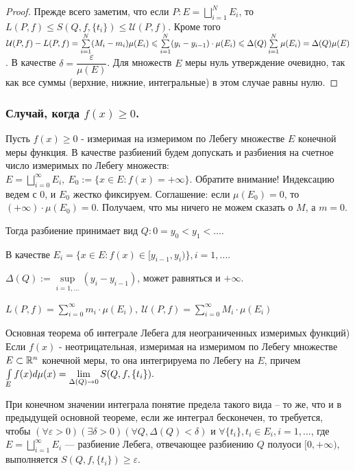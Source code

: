 \begin{proof}
	Прежде всего заметим, что если $P: E=\bigsqcup\limits_{i=1}^N E_i$, то\newline $L(P, f)\leqslant S(Q, f, \{t_i\})\leqslant \mathcal{U}(P, f)$. Кроме того $\mathcal{U}(P, f) - L(P, f) = \sum\limits_{i=1}^N(M_i-m_i)\mu(E_i) \?\leqslant \sum\limits_{i=1}^N (y_i-y_{i-1})\cdot\mu(E_i)\leqslant \Delta(Q) \sum\limits_{i=1}^N\mu(E_i)=\Delta(Q)\mu(E)$. В качестве $\delta = \dfrac{\varepsilon}{\mu(E)}$. Для множеств $ E $ меры нуль утверждение очевидно, так как все суммы (верхние, нижние, интегральные) в этом случае равны нулю.
\end{proof}

\subsubsection{Случай, когда $f(x)\geqslant 0$.}
Пусть $f(x)\geqslant 0$ - измеримая на измеримом по Лебегу множестве $E$ конечной меры функция. В качестве разбиений будем допускать и разбиения на счетное число измеримых по Лебегу множеств: $E = \bigsqcup\limits_{i=0 }^{\infty}E_i,\ E_0:=\{x\in E:f(x)=+\infty\}$. Обратите внимание! Индексацию ведем с 0, и $E_0$ жестко фиксируем. Соглашение: если $\mu(E_0)=0$, то $(+\infty)\cdot \mu(E_0)=0$. Получаем, что мы ничего не можем сказать о $M$, а $m=0$. 

Тогда разбиение принимает вид $Q: 0=y_0<y_1<\ldots$. 

В качестве $E_i = \{x\in E: f(x)\in[y_{i-1}, y_i)\}, i=1,\ldots$.

$\Delta(Q):=\sup\limits_{i=1, \ldots}(y_i-y_{i-1})$, может равняться и $+\infty$.

$L(P, f)=\sum\limits_{i=0}^{\infty}m_i\cdot \mu(E_i),\  \mathcal{U}(P, f)=\sum\limits_{i=0}^{\infty}M_i\cdot \mu(E_i)$ 

\begin{theorem}Основная теорема об интеграле Лебега для неограниченных измеримых функций)
Если $f(x)$ - неотрицательная, измеримая на измеримом по Лебегу множестве $E\subset \R^n$ конечной меры, то она интегрируема по Лебегу на $E$, причем
$\int\limits_E f(x)d\mu(x)\?=\lim\limits_{\Delta(Q)\to0}S(Q, f, \{t_i\}).$ 

При конечном значении интеграла понятие предела такого вида -- то же, что и в предыдущей основной теореме, если же интеграл бесконечен, то требуется, чтобы \newline$(\forall \varepsilon>0)( \exists \delta > 0)(\forall Q, \Delta(Q)<\delta) \text{ и } \forall \{t_i\}, t_i \in E_i, i=1,\ldots$, где $E=\bigsqcup\limits_{i=1}^{\infty} E_i$ --- разбиение Лебега, отвечающее разбиению $Q$ полуоси $[0, +\infty)$, выполняется $S(Q, f, \{t_i\})\geqslant\varepsilon$.
\end{theorem}

